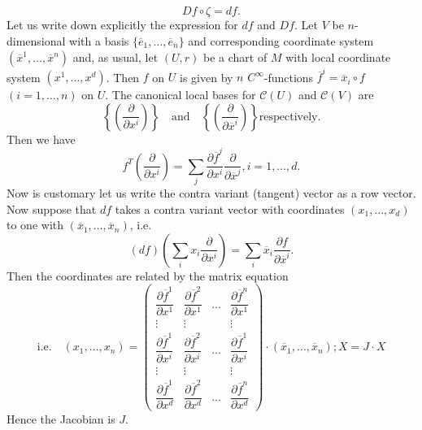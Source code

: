 \subsection{}\label{chap0:0.1.13}
$$
Df\circ \zeta=df.
$$
Let us write down explicitly the expression for $df$ and $Df$. Let
$V$ be $n$-dimensional with a basis
$\{\overline{e}_{1},\ldots,\overline{e}_{n}\}$ and corresponding
coordinate system $(\overline{x}^{1},\ldots,\overline{x}^{n})$ and, as
usual, let $(U,r)$ be a chart of $M$ with local coordinate system
$(x^{1},\ldots, x^{d})$. Then $f$ on $U$ is given by $n$
$C^{\infty}$-functions $\overline{f}^{i}=\overline{x}_{i}\circ f$
$(i=1,\ldots,n)$ on $U$. The canonical local bases for
$\mathscr{C}(U)$ and $\mathscr{C}(V)$ are
$$
\left\{\left(\dfrac{\partial}{\partial x^{i}}\right)\right\}\quad\text{and}\quad
\left\{\left(\dfrac{\partial}{\partial \overline{x}^{i}}\right)\right\}\text{
  \ respectively}. 
$$\pageoriginale
Then we have
\begin{equation*}\label{chap0:0.1.14}
f^{T}\left(\dfrac{\partial}{\partial
  x^{i}}\right)=\sum_{j}\dfrac{\partial \overline{f}^{j}}{\partial
  x^{i}}\dfrac{\partial}{\partial \overline{x}^{j}},i=1,\ldots,d.\tag{0.1.14}
\end{equation*}
Now is customary let us write the contra variant (tangent) vector as a
row vector. Now suppose that $df$ takes a contra variant vector with
coordinates $(x_{1},\ldots,x_{d})$ to one with
$(\overline{x}_{1},\ldots,\overline{x}_{n})$, i.e.
\begin{equation*}\label{chap0:0.1.15}
(df)\left(\sum_{i}x_{i}\dfrac{\partial}{\partial
    x^{i}}\right)=\sum_{i}\overline{x}_{i}\dfrac{\partial f}{\partial
    \overline{x}^{i}}.\tag{0.1.15}
\end{equation*}
Then the coordinates are related by the matrix equation
\begin{equation*}
\text{i.e.}\quad (x_{1},\ldots,x_{n})=
\begin{pmatrix}
\dfrac{\partial \overline{f}^{1}}{\partial x^{1}} & \dfrac{\partial
  \overline{f}^{2}}{\partial x^{1}} & \ldots & \dfrac{\partial
  \overline{f}^{n}}{\partial x^{1}}\\[5pt]
\vdots & \vdots & & \vdots\\[5pt]
\dfrac{\partial \overline{f}^{1}}{\partial x^{i}} & \dfrac{\partial
  \overline{f}^{2}}{\partial x^{i}} & \ldots & \dfrac{\partial
  \overline{f}^{1}}{\partial x^{i}}\\[5pt]
\vdots & \vdots & & \vdots\\[5pt]
\dfrac{\partial \overline{f}^{1}}{\partial x^{d}} &
\dfrac{\partial\overline{f}^{2}}{\partial x^{d}} &\ldots &
\dfrac{\partial \overline{f}^{n}}{\partial x^{d}}
\end{pmatrix}
\cdot (\overline{x}_{1},\ldots,\overline{x}_{n}); X=J\cdot X
\tag{0.1.16}\label{chap0:0.1.16}
\end{equation*}
Hence the Jacobian is $J$. 

